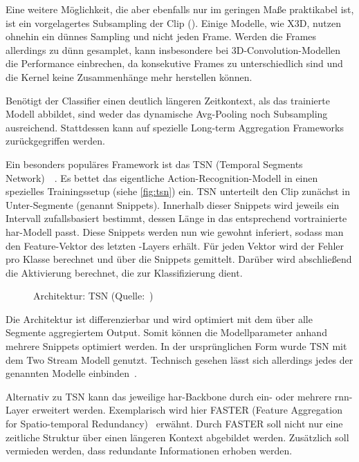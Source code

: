 Eine weitere Möglichkeit, die aber ebenfalls nur im geringen Maße praktikabel ist, ist ein vorgelagertes Subsampling der Clip (\cite{Ng15}).
Einige Modelle, wie X3D, nutzen ohnehin ein dünnes Sampling und nicht jeden Frame.
Werden die Frames allerdings zu dünn gesamplet, kann insbesondere bei 3D-Convolution-Modellen die Performance einbrechen, da konsekutive Frames zu unterschiedlich sind und die Kernel keine Zusammenhänge mehr herstellen können.

Benötigt der Classifier einen deutlich längeren Zeitkontext, als das trainierte Modell abbildet, sind weder das dynamische Avg-Pooling noch Subsampling ausreichend.
Stattdessen kann auf spezielle Long-term Aggregation Frameworks zurückgegriffen werden.

Ein besonders populäres Framework ist das TSN (Temporal Segments Network)~\cite{Wang16}~\cite{Wang19}.
Es bettet das eigentliche Action-Recognition-Modell in einen spezielles Trainingssetup (siehe \autoref{fig:tsn}) ein.
TSN unterteilt den Clip zunächst in Unter-Segmente (genannt Snippets).
Innerhalb dieser Snippets wird jeweils ein Intervall zufallsbasiert bestimmt, dessen Länge in das entsprechend vortrainierte \gls{har}-Modell passt.
Diese Snippets werden nun wie gewohnt inferiert, sodass man den Feature-Vektor des letzten \fc-Layers erhält.
Für jeden Vektor wird der Fehler pro Klasse berechnet und über die Snippets gemittelt.
Darüber wird abschließend die Aktivierung berechnet, die zur Klassifizierung dient.

\begin{figure}[h!]
    \centering
    \caption{Architektur: TSN (Quelle:~\cite{Wang19})}
    \label{fig:tsn}
\end{figure}

Die Architektur ist differenzierbar und wird optimiert mit dem über alle Segmente aggregiertem Output.
Somit können die Modellparameter anhand mehrere Snippets optimiert werden.
In der ursprünglichen Form wurde TSN mit dem Two Stream Modell genutzt.
Technisch gesehen lässt sich allerdings jedes der genannten Modelle einbinden~\cite{Kothawade19}.

Alternativ zu TSN kann das jeweilige \gls{har}-Backbone durch ein- oder mehrere \gls{rnn}-Layer erweitert werden.
Exemplarisch wird hier FASTER (Feature Aggregation for Spatio-temporal Redundancy)~\cite{Zhu19} erwähnt.
Durch FASTER soll nicht nur eine zeitliche Struktur über einen längeren Kontext abgebildet werden.
Zusätzlich soll vermieden werden, dass redundante Informationen erhoben werden.

